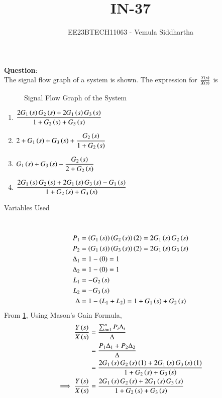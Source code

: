 \documentclass[journal,12pt,twocolumn]{IEEEtran}
\theoremstyle{remark}
\begin{document}

\vspace{3cm}

\title{IN-37}
\author{EE23BTECH11063 - Vemula Siddhartha}
\maketitle
\newpage
\bigskip

\renewcommand{\thefigure}{\theenumi}
\renewcommand{\thetable}{\theenumi}
\textbf{Question}:\\
The signal flow graph of a system is shown. The expression for $\frac{Y\left(s\right)}{X\left(s\right)}$ is
\begin{figure}[h]
    \centering
    
    \caption{Signal Flow Graph of the System}
    \label{fig:sfg_in-37-2022}
\end{figure}
\begin{enumerate}[label=(\alph*)]
    \item $\dfrac{2 G_1\left(s\right) G_2\left(s\right) + 2 G_1\left(s\right) G_3\left(s\right) }{ 1 + G_2\left(s\right) + G_3\left(s\right) }$
    \item $ 2 + G_1\left(s\right) + G_3\left(s\right) + \dfrac{G_2\left(s\right) }{ 1 + G_2\left(s\right)}$
    \item $G_1\left(s\right) + G_3\left(s\right) - \dfrac{G_2\left(s\right) }{ 2 + G_2\left(s\right) }$
    \item $\dfrac{ 2 G_1\left(s\right) G_2\left(s\right) + 2 G_1\left(s\right) G_3\left(s\right) - G_1\left(s\right) }{ 1 + G_2\left(s\right) + G_3\left(s\right) }$
\end{enumerate}
\solution
\begin{table}[h!]    
    \centering
    
    \caption{Variables Used}
  \end{table}\\
  \begin{align}
    P_1 &= \left(G_1\left(s\right)\right) \left(G_2\left(s\right)\right) \left(2\right) = 2 G_1\left(s\right) G_2\left(s\right) \\
    P_2 &= \left(G_1\left(s\right)\right) \left(G_3\left(s\right)\right) \left(2\right) = 2 G_1\left(s\right) G_3\left(s\right) \\
    \Delta_1 &= 1 - \left(0\right) = 1 \\
    \Delta_2 &= 1 - \left(0\right) = 1 \\
    L_1 &= -G_2\left(s\right) \\
    L_2 &= -G_3\left(s\right) \\
    \Delta &= 1 - \left(L_1 + L_2\right) = 1 + G_1\left(s\right) + G_2\left(s\right)
  \end{align}
  From \ref{fig:sfg_in-37-2022}, Using Mason's Gain Formula,
  \begin{align}
    \frac { Y\left(s\right) }{ X\left(s\right) } &= \frac { \sum_{ i = 1 }^{ n } P_i \Delta_i } { \Delta } \\
    &= \frac { P_1 \Delta_1 + P_2 \Delta_2 } { \Delta } \\
    &= \frac { 2 G_1\left(s\right) G_2 \left(s\right) \left(1\right) + 2 G_1\left(s\right) G_3\left(s\right) \left(1\right) } { 1 + G_2\left(s\right) + G_3\left(s\right) } \\
    \implies \frac { Y\left(s\right) }{ X\left(s\right) } &= \frac { 2 G_1\left(s\right) G_2\left(s\right) + 2 G_1\left(s\right) G_3\left(s\right) } { 1 + G_2\left(s\right) + G_3\left(s\right) }
  \end{align}
\end{document}
